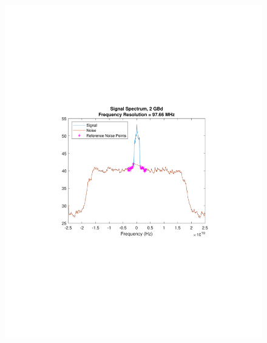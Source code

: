 \begin{refsection}
\begin{figure}[H]
	\begin{minipage}{0.43\textwidth}
		\centering
		\includegraphics[clip, trim=4cm 8cm 4cm 8cm,
		width=1\textwidth]{./sdf/m_qam_system/figures/snr/minMaxSpec/2GBdMinSpecHSNR.pdf}
		\subcaption{\label{fig:snrMinFreq_2_10_500}}
		

\end{minipage}
\end{figure}
\end{refsection}
